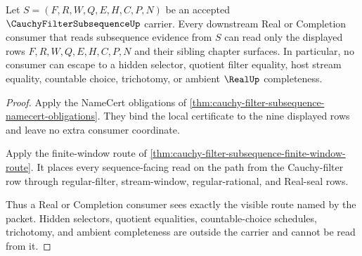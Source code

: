 \begin{theorem}
\label{thm:cauchy-filter-subsequence-nonescape}
Let $S=(F,R,W,Q,E,H,C,P,N)$ be an accepted $\CauchyFilterSubsequenceUp$ carrier. Every downstream Real or Completion consumer that reads subsequence evidence from $S$ can read only the displayed rows $F,R,W,Q,E,H,C,P,N$ and their sibling chapter surfaces. In particular, no consumer can escape to a hidden selector, quotient filter equality, host stream equality, countable choice, trichotomy, or ambient $\RealUp$ completeness.
\end{theorem}
\begin{proof}
Apply the NameCert obligations of \autoref{thm:cauchy-filter-subsequence-namecert-obligations}. They bind the local certificate to the nine displayed rows and leave no extra consumer coordinate.

Apply the finite-window route of \autoref{thm:cauchy-filter-subsequence-finite-window-route}. It places every sequence-facing read on the path from the Cauchy-filter row through regular-filter, stream-window, regular-rational, and Real-seal rows.

Thus a Real or Completion consumer sees exactly the visible route named by the packet. Hidden selectors, quotient equalities, countable-choice schedules, trichotomy, and ambient completeness are outside the carrier and cannot be read from it.
\end{proof}




